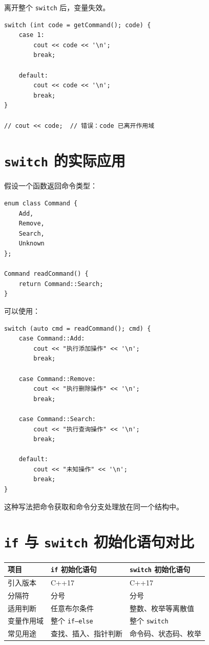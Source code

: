\documentclass[UTF8,12pt,a4paper]{ctexart}
\begin{document}
离开整个 \texttt{switch} 后，变量失效。

\begin{lstlisting}
switch (int code = getCommand(); code) {
    case 1:
        cout << code << '\n';
        break;

    default:
        cout << code << '\n';
        break;
}

// cout << code;  // 错误：code 已离开作用域
\end{lstlisting}

\section{\texttt{switch} 的实际应用}

假设一个函数返回命令类型：

\begin{lstlisting}
enum class Command {
    Add,
    Remove,
    Search,
    Unknown
};

Command readCommand() {
    return Command::Search;
}
\end{lstlisting}

可以使用：

\begin{lstlisting}
switch (auto cmd = readCommand(); cmd) {
    case Command::Add:
        cout << "执行添加操作" << '\n';
        break;

    case Command::Remove:
        cout << "执行删除操作" << '\n';
        break;

    case Command::Search:
        cout << "执行查询操作" << '\n';
        break;

    default:
        cout << "未知操作" << '\n';
        break;
}
\end{lstlisting}

这种写法把命令获取和命令分支处理放在同一个结构中。

\section{\texttt{if} 与 \texttt{switch} 初始化语句对比}

\begin{center}
\begin{tabular}{lll}
\toprule
项目 & \texttt{if} 初始化语句 & \texttt{switch} 初始化语句 \\
\midrule
引入版本 & C++17 & C++17 \\
分隔符 & 分号 & 分号 \\
适用判断 & 任意布尔条件 & 整数、枚举等离散值 \\
变量作用域 & 整个 \texttt{if--else} & 整个 \texttt{switch} \\
常见用途 & 查找、插入、指针判断 & 命令码、状态码、枚举 \\
\bottomrule
\end{tabular}
\end{center}
\end{document}
